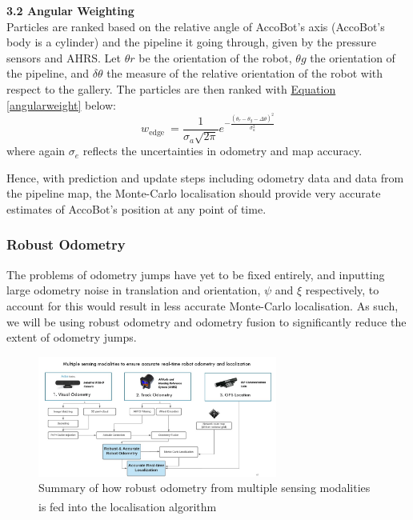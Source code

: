 \documentclass[11pt]{article}		%
\newcommand{\supercite}[1]{\textsuperscript{\cite{#1}}}		%
\newcommand{\equationref}[1]{\hyperref[#1]{Equation \ref*{#1}}}     %
\begin{document}
    \textbf{3.2 Angular Weighting}
    \\Particles are ranked based on the relative angle of AccoBot's axis (AccoBot's body is a cylinder) and the pipeline it going through, given by the pressure sensors and AHRS. Let $\theta r$ be the orientation of the robot, $\theta g$ the orientation of the pipeline, and $\delta \theta$ the measure of the relative orientation of the robot with respect to the gallery. The particles are then ranked with \equationref{angularweight} below:
    \begin{equation}
w_{\text {edge }}=\frac{1}{\sigma_{a} \sqrt{2 \pi}} e^{-\frac{\left(\theta_{r}-\theta_{g}-\Delta \theta\right)^{2}}{\sigma_{a}^{2}}}\label{angularweight}
\end{equation}
	 where again $\sigma_e$ reflects the uncertainties in odometry and map accuracy.
	 
	 Hence, with prediction and update steps including odometry data and data from the pipeline map, the Monte-Carlo localisation should provide very accurate estimates of AccoBot's position at any point of time.
	 
	\subsubsection{Robust Odometry}
	The problems of odometry jumps have yet to be fixed entirely, and inputting large odometry noise in translation and orientation, $\psi$ and $\xi$ respectively, to account for this would result in less accurate Monte-Carlo localisation. As such, we will be using robust odometry and odometry fusion to significantly reduce the extent of odometry jumps. 
	
										\begin{figure}[h]
				\centering
				\includegraphics[width=0.7\textwidth]{robustodometry.jpg}
				\caption{Summary of how robust odometry from multiple sensing modalities is fed into the localisation algorithm\supercite{ELFTransmitter}}
				\label{localisationChart}
			\end{figure}
			
\end{document}
